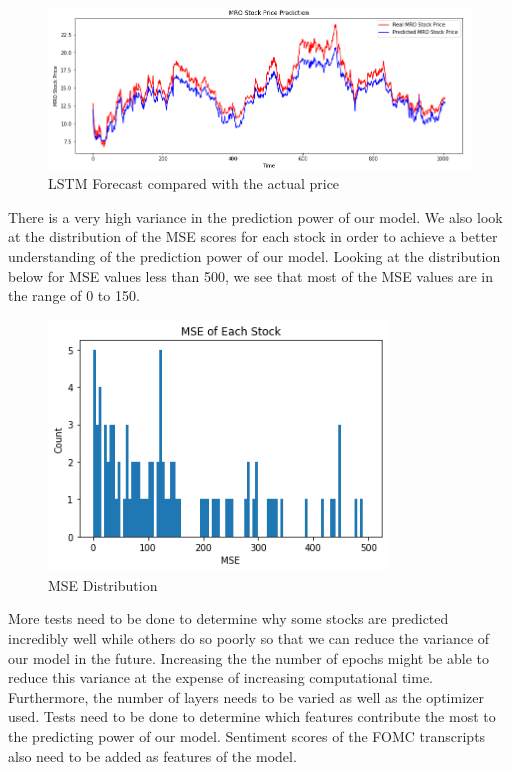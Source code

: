 \documentclass{article}
\begin{document}
\begin{figure}
    \centering
    \includegraphics[width = 12cm]{Final MRO.png}
    \caption{LSTM Forecast compared with the actual price}
\end{figure}
There is a very high variance in the prediction power of our model. We also look at the distribution of the MSE scores for each stock in order to achieve a better understanding of the prediction power of our model. Looking at the distribution below for MSE values less than 500, we  see that most of the MSE values are in the range of 0 to 150.
\begin{figure}
    \centering
    \includegraphics[width = 9cm]{MSE grouping.png}
    \caption{MSE Distribution}
\end{figure}
More tests need to be done to determine why some stocks are predicted incredibly well while others do so poorly so that we can reduce the variance of our model in the future. Increasing the the number of epochs might be able to reduce this variance at the expense of increasing computational time. Furthermore, the number of layers needs to be varied as well as the optimizer used. Tests need to be done to determine which features contribute the most to the predicting power of our model. Sentiment scores of the FOMC transcripts also need to be added as features of the model.  
\end{document}
